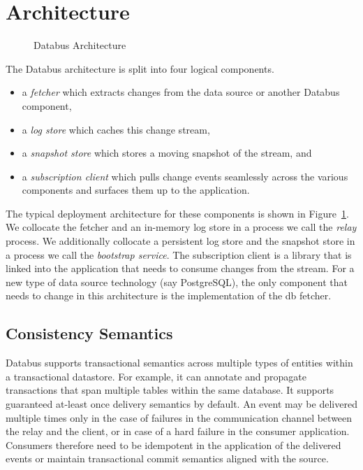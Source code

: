 \section{Architecture}

\begin{figure}
\centering
{}
\caption{Databus Architecture}
\label{fig:databus-architecture}
\end{figure}

The Databus architecture is split into four logical components. 
\begin{itemize}
\item a \emph{fetcher} which extracts changes from the data source or another Databus component, 
\item a \emph{log store} which caches this change stream, 
\item a \emph{snapshot store} which stores a moving snapshot of the stream, and 
\item a \emph{subscription client} which pulls change events seamlessly across the various components and surfaces them up to the application. 
\end{itemize}

The typical deployment architecture for these components is shown in Figure~\ref{fig:databus-architecture}. We collocate the fetcher and an in-memory log store in a process we call the \emph{relay} process. We additionally collocate a persistent log store and the snapshot store in a process we call the \emph{bootstrap service}. The subscription client is a library that is linked into the application that needs to consume changes from the stream. For a new type of data source technology (say PostgreSQL), the only component that needs to change in this architecture is the implementation of the db fetcher. 
 
\subsection{Consistency Semantics}
Databus supports transactional semantics across multiple types of entities within a transactional datastore. For example, it can annotate and propagate transactions that span multiple tables within the same database. It supports guaranteed at-least once delivery semantics by default. An event may be delivered multiple times only in the case of failures in the communication channel between the relay and the client, or in case of a hard failure in the consumer application. Consumers therefore need to be idempotent in the application of the delivered events or maintain transactional commit semantics aligned with the source. 








%
